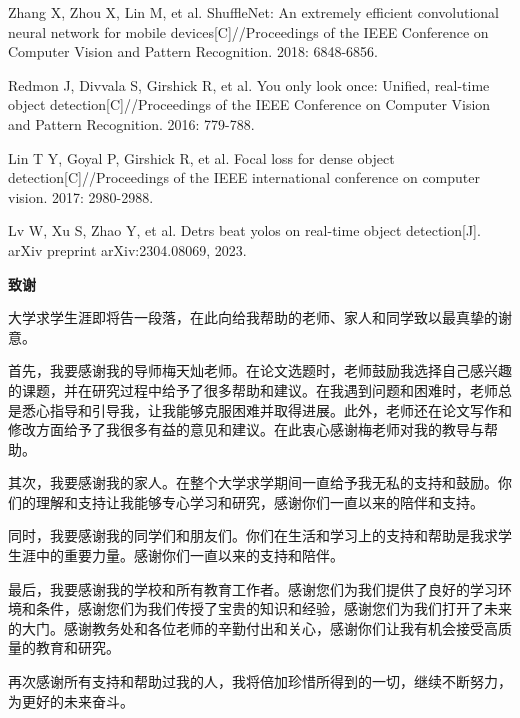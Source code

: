 \documentclass{ctexart}
\numberwithin{equation}{section}%
\numberwithin{figure}{section}%
\numberwithin{table}{section}%
\begin{document}
\begin{thebibliography}{99}
	Zhang X, Zhou X, Lin M, et al. ShuffleNet: An extremely efficient convolutional neural network for mobile devices[C]//Proceedings of the IEEE Conference on Computer Vision and Pattern Recognition. 2018: 6848-6856.
	
	Redmon J, Divvala S, Girshick R, et al. You only look once: Unified, real-time object detection[C]//Proceedings of the IEEE Conference on Computer Vision and Pattern Recognition. 2016: 779-788.
	
	Lin T Y, Goyal P, Girshick R, et al. Focal loss for dense object detection[C]//Proceedings of the IEEE international conference on computer vision. 2017: 2980-2988.
	
	Lv W, Xu S, Zhao Y, et al. Detrs beat yolos on real-time object detection[J]. arXiv preprint arXiv:2304.08069, 2023.
	\end{thebibliography}
	
	

	\newpage
	\begin{center}
		\heiti{}\textbf{致谢}
	\end{center}
	\qquad 大学求学生涯即将告一段落，在此向给我帮助的老师、家人和同学致以最真挚的谢意。
	
	首先，我要感谢我的导师梅天灿老师。在论文选题时，老师鼓励我选择自己感兴趣的课题，并在研究过程中给予了很多帮助和建议。在我遇到问题和困难时，老师总是悉心指导和引导我，让我能够克服困难并取得进展。此外，老师还在论文写作和修改方面给予了我很多有益的意见和建议。在此衷心感谢梅老师对我的教导与帮助。
	
	其次，我要感谢我的家人。在整个大学求学期间一直给予我无私的支持和鼓励。你们的理解和支持让我能够专心学习和研究，感谢你们一直以来的陪伴和支持。
	
	同时，我要感谢我的同学们和朋友们。你们在生活和学习上的支持和帮助是我求学生涯中的重要力量。感谢你们一直以来的支持和陪伴。
	
	最后，我要感谢我的学校和所有教育工作者。感谢您们为我们提供了良好的学习环境和条件，感谢您们为我们传授了宝贵的知识和经验，感谢您们为我们打开了未来的大门。感谢教务处和各位老师的辛勤付出和关心，感谢你们让我有机会接受高质量的教育和研究。
	
	再次感谢所有支持和帮助过我的人，我将倍加珍惜所得到的一切，继续不断努力，为更好的未来奋斗。
	
\end{document}
